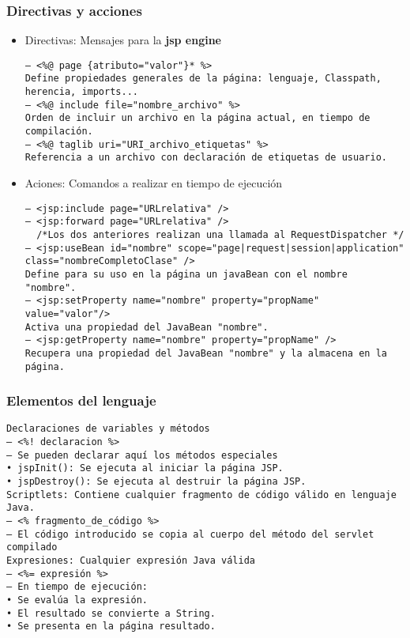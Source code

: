 \documentclass{apuntes}
\begin{document}
\subsubsection{Directivas y acciones}
\begin{itemize}
\item Directivas: Mensajes para la \textbf{jsp engine}
\begin{verbatim}
– <%@ page {atributo="valor"}* %>
Define propiedades generales de la página: lenguaje, Classpath,
herencia, imports...
– <%@ include file="nombre_archivo" %>
Orden de incluir un archivo en la página actual, en tiempo de
compilación.
– <%@ taglib uri="URI_archivo_etiquetas" %>
Referencia a un archivo con declaración de etiquetas de usuario.
\end{verbatim}
\item Aciones: Comandos a realizar en tiempo de ejecución
\begin{verbatim}
– <jsp:include page="URLrelativa" />
– <jsp:forward page="URLrelativa" />
  /*Los dos anteriores realizan una llamada al RequestDispatcher */
– <jsp:useBean id="nombre" scope="page|request|session|application"
class="nombreCompletoClase" />
Define para su uso en la página un javaBean con el nombre
"nombre".
– <jsp:setProperty name="nombre" property="propName"
value="valor"/>
Activa una propiedad del JavaBean "nombre".
– <jsp:getProperty name="nombre" property="propName" />
Recupera una propiedad del JavaBean "nombre" y la almacena en la
página.
\end{verbatim}
\end{itemize}

\subsubsection{Elementos del lenguaje}
\begin{verbatim}
Declaraciones de variables y métodos
– <%! declaracion %>
– Se pueden declarar aquí los métodos especiales
• jspInit(): Se ejecuta al iniciar la página JSP.
• jspDestroy(): Se ejecuta al destruir la página JSP.
Scriptlets: Contiene cualquier fragmento de código válido en lenguaje Java.
– <% fragmento_de_código %>
– El código introducido se copia al cuerpo del método del servlet compilado
Expresiones: Cualquier expresión Java válida
– <%= expresión %>
– En tiempo de ejecución:
• Se evalúa la expresión.
• El resultado se convierte a String.
• Se presenta en la página resultado.
\end{verbatim}
\end{document}
